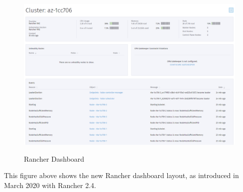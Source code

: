 \begin{figure}[H]
\centering
\caption {Rancher Dashboard}
\includegraphics[width=\linewidth]{images/cluster-dashboard-new.png}
\label{fig:clusterOverview}
\end{figure}

This figure above shows the new Rancher dashboard layout, as introduced in March 2020 with Rancher 2.4.
